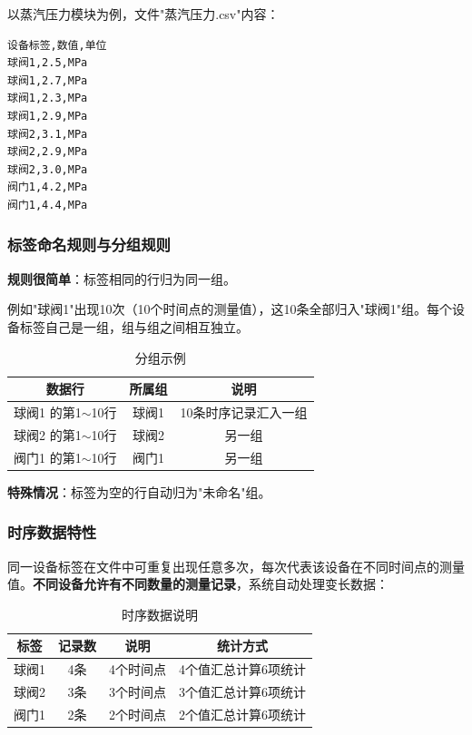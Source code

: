 \documentclass[12pt,a3paper]{ctexart}
\begin{document}
以蒸汽压力模块为例，文件"蒸汽压力.csv"内容：

\begin{lstlisting}[caption={蒸汽压力测试数据示例}]
设备标签,数值,单位
球阀1,2.5,MPa
球阀1,2.7,MPa
球阀1,2.3,MPa
球阀1,2.9,MPa
球阀2,3.1,MPa
球阀2,2.9,MPa
球阀2,3.0,MPa
阀门1,4.2,MPa
阀门1,4.4,MPa
\end{lstlisting}

\subsubsection{标签命名规则与分组规则}

\textbf{规则很简单}：标签相同的行归为同一组。

例如"球阀1"出现10次（10个时间点的测量值），这10条全部归入"球阀1"组。每个设备标签自己是一组，组与组之间相互独立。

\begin{table}[H]
\centering
\caption{分组示例}
\begin{tabular}{c|c|c}
\toprule
\textbf{数据行} & \textbf{所属组} & \textbf{说明} \\
\midrule
球阀1 的第1$\sim$10行 & 球阀1 & 10条时序记录汇入一组 \\
球阀2 的第1$\sim$10行 & 球阀2 & 另一组 \\
阀门1 的第1$\sim$10行 & 阀门1 & 另一组 \\
\bottomrule
\end{tabular}
\end{table}

\textbf{特殊情况}：标签为空的行自动归为"未命名"组。

\subsubsection{时序数据特性}

同一设备标签在文件中可重复出现任意多次，每次代表该设备在不同时间点的测量值。\textbf{不同设备允许有不同数量的测量记录}，系统自动处理变长数据：

\begin{table}[H]
\centering
\caption{时序数据说明}
\begin{tabular}{c|c|c|c}
\toprule
\textbf{标签} & \textbf{记录数} & \textbf{说明} & \textbf{统计方式} \\
\midrule
球阀1 & 4条 & 4个时间点 & 4个值汇总计算6项统计 \\
球阀2 & 3条 & 3个时间点 & 3个值汇总计算6项统计 \\
阀门1 & 2条 & 2个时间点 & 2个值汇总计算6项统计 \\
\bottomrule
\end{tabular}
\end{table}
\end{document}
